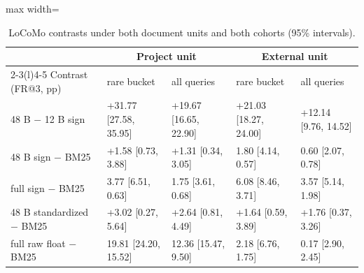 \begin{table}[H]
\centering
\footnotesize
\caption{LoCoMo contrasts under both document units and both cohorts (95\% intervals).}
\label{tab:n2}
\begin{adjustbox}{max width=\linewidth}\begin{tabular}{@{}l l l l l@{}}
\toprule
& \multicolumn{2}{c}{Project unit} & \multicolumn{2}{c}{External unit} \\
\cmidrule(lr){2-3}\cmidrule(l){4-5}
Contrast (FR@3, pp) & rare bucket & all queries & rare bucket & all queries \\
\midrule
48 B $-$ 12 B sign & +31.77 [27.58, 35.95] & +19.67 [16.65, 22.90] & +21.03 [18.27, 24.00] & +12.14 [9.76, 14.52] \\
48 B sign $-$ BM25 & +1.58 [\textminus{}0.73, 3.88] & +1.31 [\textminus{}0.34, 3.05] & \textminus{}1.80 [\textminus{}4.14, 0.57] & \textminus{}0.60 [\textminus{}2.07, 0.78] \\
full sign $-$ BM25 & \textminus{}3.77 [\textminus{}6.51, \textminus{}0.63] & \textminus{}1.75 [\textminus{}3.61, 0.68] & \textminus{}6.08 [\textminus{}8.46, \textminus{}3.71] & \textminus{}3.57 [\textminus{}5.14, \textminus{}1.98] \\
48 B standardized $-$ BM25 & +3.02 [0.27, 5.64] & +2.64 [0.81, 4.49] & +1.64 [\textminus{}0.59, 3.89] & +1.76 [0.37, 3.26] \\
full raw float $-$ BM25 & \textminus{}19.81 [\textminus{}24.20, \textminus{}15.52] & \textminus{}12.36 [\textminus{}15.47, \textminus{}9.50] & \textminus{}2.18 [\textminus{}6.76, 1.75] & \textminus{}0.17 [\textminus{}2.90, 2.45] \\
\bottomrule
\end{tabular}\end{adjustbox}
\end{table}
